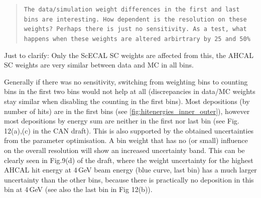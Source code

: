 \documentclass[twoside,a4paper,12pt]{article}
\begin{document}
\begin{quote}\texttt{The data/simulation weight differences in the first and last bins are interesting.  How dependent is the resolution on these weights?  Perhaps there is just no sensitivity.  As a test, what happens when these weights are altered arbirtrary by 25 and 50\%}\end{quote}
Just to clarify: Only the ScECAL SC weights are affected from this, the AHCAL SC weights are very similar between data and MC in all bins.
 
Generally if there was no sensitivity, switching from weighting bins to counting bins in the first two bins would not help at all (discrepancies in data/MC weights stay similar when disabling the counting in the first bins). Most depositions (by number of hits) are in the first bins (see \autoref{fig:hitenergies_inner_outer}), however most depositions by energy sum are neither in the first nor last bin (see Fig. 12(a),(c) in the CAN draft). This is also supported by the obtained uncertainties from the parameter optimisation. A bin weight that has no (or small) influence on the overall resolution will show an increased uncertainty band. This can be clearly seen in Fig.9(d) of the draft, where the weight uncertainty for the highest AHCAL hit energy at 4\,GeV beam energy (blue curve, last bin) has a much larger uncertainty than the other bins, because there is practically no deposition in this bin at 4\,GeV (see also the last bin in Fig 12(b)).
\end{document}
